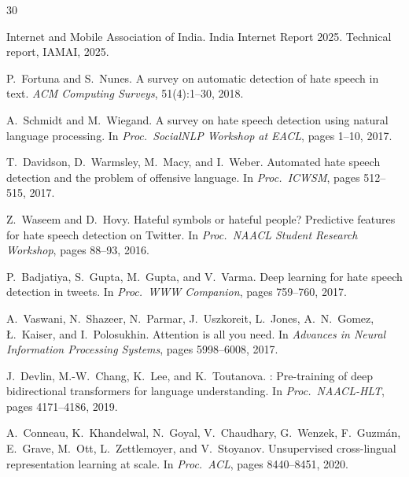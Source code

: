 \documentclass[12pt, a4paper]{article}
\begin{document}
\begin{thebibliography}{30}

Internet and Mobile Association of India.
\newblock India Internet Report 2025.
\newblock Technical report, IAMAI, 2025.

P.~Fortuna and S.~Nunes.
\newblock A survey on automatic detection of hate speech in text.
\newblock \textit{ACM Computing Surveys}, 51(4):1--30, 2018.

A.~Schmidt and M.~Wiegand.
\newblock A survey on hate speech detection using natural language processing.
\newblock In \textit{Proc.\ SocialNLP Workshop at EACL}, pages 1--10, 2017.

T.~Davidson, D.~Warmsley, M.~Macy, and I.~Weber.
\newblock Automated hate speech detection and the problem of offensive language.
\newblock In \textit{Proc.\ ICWSM}, pages 512--515, 2017.

Z.~Waseem and D.~Hovy.
\newblock Hateful symbols or hateful people? Predictive features for hate speech detection on Twitter.
\newblock In \textit{Proc.\ NAACL Student Research Workshop}, pages 88--93, 2016.

P.~Badjatiya, S.~Gupta, M.~Gupta, and V.~Varma.
\newblock Deep learning for hate speech detection in tweets.
\newblock In \textit{Proc.\ WWW Companion}, pages 759--760, 2017.

A.~Vaswani, N.~Shazeer, N.~Parmar, J.~Uszkoreit, L.~Jones, A.~N.~Gomez, \L.~Kaiser, and I.~Polosukhin.
\newblock Attention is all you need.
\newblock In \textit{Advances in Neural Information Processing Systems}, pages 5998--6008, 2017.

J.~Devlin, M.-W.~Chang, K.~Lee, and K.~Toutanova.
: Pre-training of deep bidirectional transformers for language understanding.
\newblock In \textit{Proc.\ NAACL-HLT}, pages 4171--4186, 2019.

A.~Conneau, K.~Khandelwal, N.~Goyal, V.~Chaudhary, G.~Wenzek, F.~Guzm{\'a}n, E.~Grave, M.~Ott, L.~Zettlemoyer, and V.~Stoyanov.
\newblock Unsupervised cross-lingual representation learning at scale.
\newblock In \textit{Proc.\ ACL}, pages 8440--8451, 2020.


\end{thebibliography}
\end{document}
